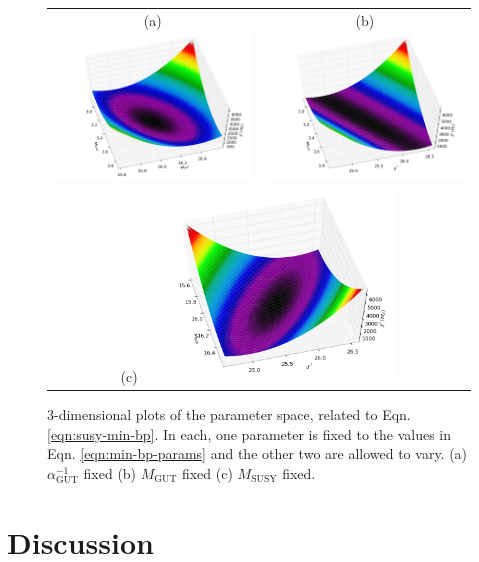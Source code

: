 \documentclass[12pt,a4paper,oneside]{article}
\begin{document}
\begin{figure}[th]
\begin{center}
\begin{tabular}{cc}
(a) \includegraphics[width=6.75cm]{figs/paramspace-1.png} & (b) \includegraphics[width=6.75cm]{figs/paramspace-2.png} \\
\multicolumn{2}{c}{(c) \includegraphics[width=6.75cm]{figs/paramspace-3.png}}
\end{tabular}
\caption[]{3-dimensional plots of the parameter space, related to Eqn. \ref{eqn:susy-min-bp}. In each, one parameter is fixed to the values in Eqn. \ref{eqn:min-bp-params} and the other two are allowed to vary. (a) $\alpha^{-1}_\mathrm{GUT}$ fixed (b) $M_\mathrm{GUT}$ fixed (c) $M_\mathrm{SUSY}$ fixed.}
\label{fig:param-space}
\end{center}
\end{figure}

\section{Discussion}
\end{document}
